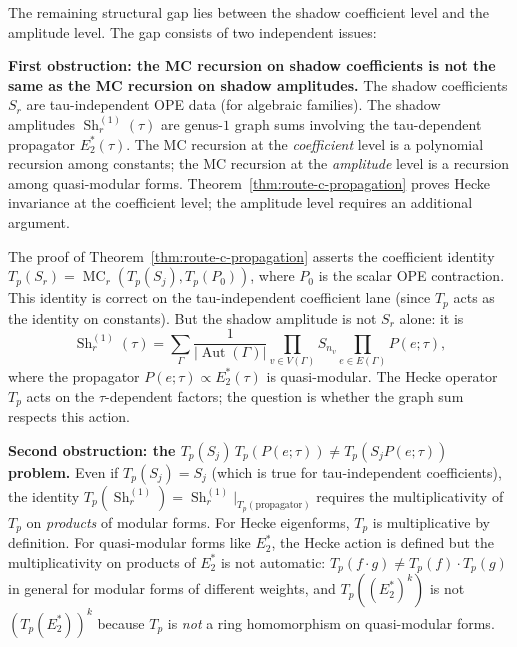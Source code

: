 \begin{remark}%
\label{rem:route-c-gap}%
The remaining structural gap lies between the shadow coefficient
level and the amplitude level. The gap consists of two
independent issues:

\textbf{First obstruction: the MC recursion on shadow coefficients is not
the same as the MC recursion on shadow amplitudes.}
The shadow coefficients $S_r$ are tau-independent OPE data
\textup{(}for algebraic families\textup{)}. The shadow amplitudes
$\operatorname{Sh}_r^{(1)}(\tau)$ are genus-$1$ graph sums
involving the tau-dependent propagator $E_2^*(\tau)$.
The MC recursion at the \emph{coefficient} level is a polynomial
recursion among constants; the MC recursion at the
\emph{amplitude} level is a recursion among quasi-modular forms.
Theorem~\ref{thm:route-c-propagation} proves Hecke invariance at the
coefficient level; the
amplitude level requires an additional argument.

The proof of Theorem~\ref{thm:route-c-propagation} asserts the
coefficient identity
$T_p(S_r) = \operatorname{MC}_r(T_p(S_j), T_p(P_0))$,
where $P_0$ is the scalar OPE contraction. This identity is correct
on the tau-independent coefficient lane \textup{(}since $T_p$ acts
as the identity on constants\textup{)}. But the shadow amplitude is
not $S_r$ alone: it is
\begin{equation}\label{eq:shadow-amplitude-graph-sum}
 \operatorname{Sh}_r^{(1)}(\tau)
 = \sum_\Gamma
 \frac{1}{|\operatorname{Aut}(\Gamma)|}
 \prod_{v \in V(\Gamma)} S_{n_v}
 \prod_{e \in E(\Gamma)} P(e;\tau),
\end{equation}
where the propagator $P(e;\tau) \propto E_2^*(\tau)$ is
quasi-modular. The Hecke operator $T_p$ acts on the
$\tau$-dependent factors; the question is whether the graph
sum respects this action.

\textbf{Second obstruction: the $T_p(S_j)\,T_p(P(e;\tau)) \neq
T_p(S_j P(e;\tau))$ problem.}
Even if $T_p(S_j) = S_j$ \textup{(}which is true for
tau-independent coefficients\textup{)}, the identity
$T_p(\operatorname{Sh}_r^{(1)}) =
\operatorname{Sh}_r^{(1)}|_{T_p(\text{propagator})}$
requires the multiplicativity of $T_p$ on \emph{products} of
modular forms. For Hecke eigenforms, $T_p$ is multiplicative
by definition. For quasi-modular forms like $E_2^*$, the Hecke
action is defined but the multiplicativity on products of $E_2^*$
is not automatic: $T_p(f \cdot g) \neq T_p(f) \cdot T_p(g)$
in general for modular forms of different weights, and
$T_p((E_2^*)^k)$ is not $(T_p(E_2^*))^k$ because $T_p$ is
\emph{not} a ring homomorphism on quasi-modular forms.


\end{remark}
